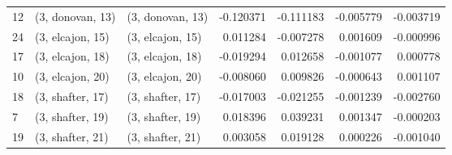 \begin{tabular}{lllrrrr}
12 &  (3, donovan, 13) &  (3, donovan, 13) & -0.120371 & -0.111183 &  -0.005779 & -0.003719 \\
24 &  (3, elcajon, 15) &  (3, elcajon, 15) &  0.011284 & -0.007278 &   0.001609 & -0.000996 \\
17 &  (3, elcajon, 18) &  (3, elcajon, 18) & -0.019294 &  0.012658 &  -0.001077 &  0.000778 \\
10 &  (3, elcajon, 20) &  (3, elcajon, 20) & -0.008060 &  0.009826 &  -0.000643 &  0.001107 \\
18 &  (3, shafter, 17) &  (3, shafter, 17) & -0.017003 & -0.021255 &  -0.001239 & -0.002760 \\
7  &  (3, shafter, 19) &  (3, shafter, 19) &  0.018396 &  0.039231 &   0.001347 & -0.000203 \\
19 &  (3, shafter, 21) &  (3, shafter, 21) &  0.003058 &  0.019128 &   0.000226 & -0.001040 \\
\bottomrule
\end{tabular}
